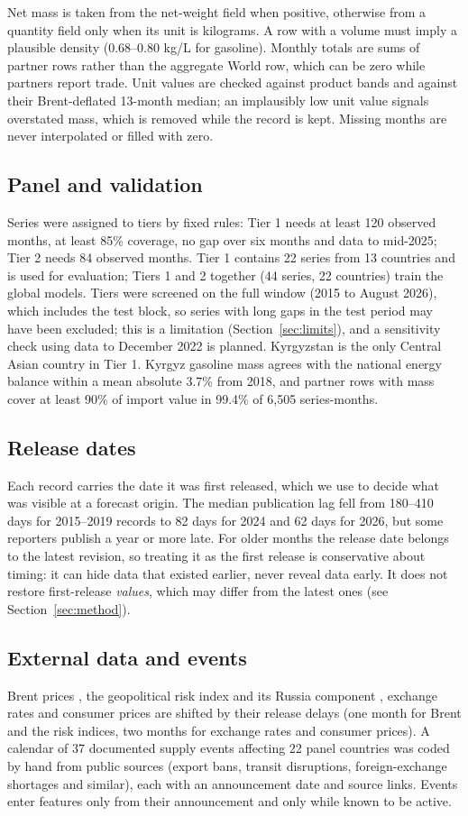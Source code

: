 \documentclass[conference]{IEEEtran}
\begin{document}
Net mass is taken from the net-weight field when positive, otherwise from a quantity field only when its unit is kilograms. A row with a volume must imply a plausible density (0.68--0.80 kg/L for gasoline). Monthly totals are sums of partner rows rather than the aggregate World row, which can be zero while partners report trade. Unit values are checked against product bands and against their Brent-deflated 13-month median; an implausibly low unit value signals overstated mass, which is removed while the record is kept. Missing months are never interpolated or filled with zero.

\subsection{Panel and validation}
Series were assigned to tiers by fixed rules: Tier 1 needs at least 120 observed months, at least 85\% coverage, no gap over six months and data to mid-2025; Tier 2 needs 84 observed months. Tier 1 contains 22 series from 13 countries and is used for evaluation; Tiers 1 and 2 together (44 series, 22 countries) train the global models. Tiers were screened on the full window (2015 to August 2026), which includes the test block, so series with long gaps in the test period may have been excluded; this is a limitation (Section~\ref{sec:limits}), and a sensitivity check using data to December 2022 is planned. Kyrgyzstan is the only Central Asian country in Tier 1. Kyrgyz gasoline mass agrees with the national energy balance \cite{nsc_balance} within a mean absolute 3.7\% from 2018, and partner rows with mass cover at least 90\% of import value in 99.4\% of 6,505 series-months.

\subsection{Release dates}
Each record carries the date it was first released, which we use to decide what was visible at a forecast origin. The median publication lag fell from 180--410 days for 2015--2019 records to 82 days for 2024 and 62 days for 2026, but some reporters publish a year or more late. For older months the release date belongs to the latest revision, so treating it as the first release is conservative about timing: it can hide data that existed earlier, never reveal data early. It does not restore first-release \emph{values}, which may differ from the latest ones (see Section~\ref{sec:method}).

\subsection{External data and events}
Brent prices \cite{eia_brent}, the geopolitical risk index and its Russia component \cite{caldara2022}, exchange rates and consumer prices are shifted by their release delays (one month for Brent and the risk indices, two months for exchange rates and consumer prices). A calendar of 37 documented supply events affecting 22 panel countries was coded by hand from public sources (export bans, transit disruptions, foreign-exchange shortages and similar), each with an announcement date and source links. Events enter features only from their announcement and only while known to be active.
\end{document}
